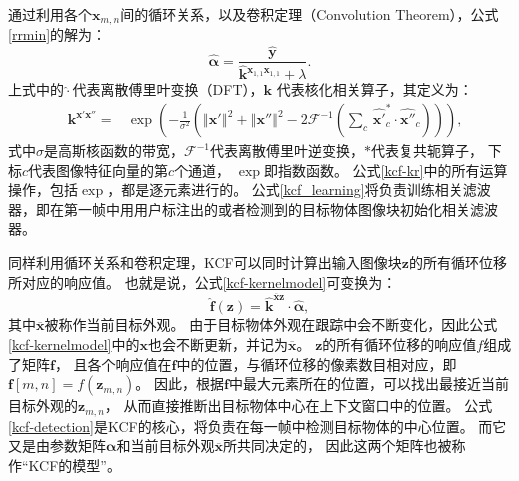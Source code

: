 通过利用各个$\mathbf{x}_{m,n}$间的循环关系，以及卷积定理（Convolution Theorem），公式\ref{rrmin}的解为：
\begin{equation}
	\hat{\boldsymbol{\alpha}}=\frac{\hat{\mathbf{y}}}{\hat{\mathbf{k}}{}^{\mathbf{x}_{1,1}\mathbf{x}_{1,1}}+\lambda}.\label{kcf_learning}
\end{equation}
上式中的$\hat{\cdot}$代表离散傅里叶变换（DFT），$\mathbf{k}$ 代表核化相关算子，其定义为：
\begin{equation}
\begin{aligned}
	&\mathbf{k}^{\mathbf{x' x''}}=
	&\exp\left(-\frac{1}{\sigma^{2}}\left(\left\Vert \mathbf{x'}\right\Vert ^{2}+\left\Vert \mathbf{x''}\right\Vert ^{2}
	-2\mathcal{F}^{-1}\left(\sum_{c}\,\hat{\mathbf{x'}}_{c}^{*}\cdot\hat{\mathbf{x''}}{}_{c}\right)\right)\right), \label{kcf-kr}
\end{aligned}
\end{equation}
式中$\sigma$是高斯核函数的带宽，$\mathcal{F}^{-1}$代表离散傅里叶逆变换，${*}$代表复共轭算子，
下标$c$代表图像特征向量的第$c$个通道， $\exp$即指数函数。
公式\ref{kcf-kr}中的所有运算操作，包括$\exp$，都是逐元素进行的。
公式\ref{kcf_learning}将负责训练相关滤波器，即在第一帧中用用户标注出的或者检测到的目标物体图像块初始化相关滤波器。

同样利用循环关系和卷积定理，KCF可以同时计算出输入图像块$\mathbf{z}$的所有循环位移所对应的响应值。
也就是说，公式\ref{kcf-kernelmodel}可变换为：
\begin{equation}
	\hat{\mathbf{f}}(\mathbf{z})=\hat{\mathbf{k}}^{\overline{\mathbf{x}}\mathbf{z}}\cdot\hat{\boldsymbol{\alpha}},\label{kcf-detection}
\end{equation}
其中$\overline{\mathbf{x}}$被称作当前目标外观。
由于目标物体外观在跟踪中会不断变化，因此公式\ref{kcf-kernelmodel}中的$\mathbf{x}$也会不断更新，并记为$\overline{\mathbf{x}}$。
$\mathbf{z}$的所有循环位移的响应值$f$组成了矩阵$\mathbf{f}$，
且各个响应值在$\mathbf{f}$中的位置，与循环位移的像素数目相对应，即$\mathbf{f}[m,n]=f(\mathbf{z}_{m,n})$。
因此，根据$\mathbf{f}$中最大元素所在的位置，可以找出最接近当前目标外观的$\mathbf{z}_{m,n}$，
从而直接推断出目标物体中心在上下文窗口中的位置。
公式\ref{kcf-detection}是KCF的核心，将负责在每一帧中检测目标物体的中心位置。
而它又是由参数矩阵$\boldsymbol{\alpha}$和当前目标外观$\overline{\mathbf{x}}$所共同决定的，
因此这两个矩阵也被称作``KCF的模型''。

